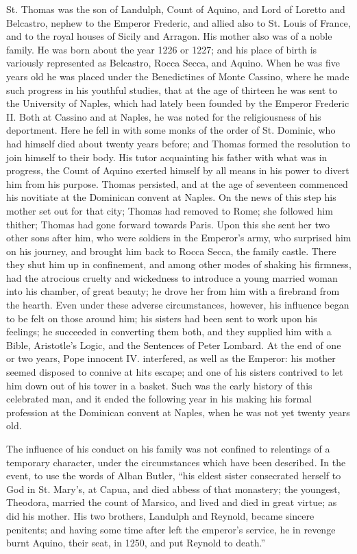 St. Thomas was the son of Landulph, Count of Aquino,
and Lord of Loretto and Belcastro, nephew to the Emperor Frederic, and
allied also to St. Louis of France, and to the royal houses of Sicily
and Arragon. His mother also was of a noble family. He was born about
the year 1226 or 1227; and his place of birth is variously represented
as Belcastro, Rocca Secca, and Aquino. When he was five years old he was
placed under the Benedictines of Monte Cassino, where he made such
progress in his youthful studies, that at the age of thirteen he was
sent to the University of Naples, which had lately been founded by the
Emperor Frederic II. Both at Cassino and at Naples, he was noted for the
religiousness of his deportment. Here he fell in with some monks of the
order of St. Dominic, who had himself died about twenty years before;
and Thomas formed the resolution to join himself to their body. His
tutor acquainting his father with what was in progress, the Count of
Aquino exerted himself by all means in his power to divert him from his
purpose. Thomas persisted, and at the age of seventeen commenced his
novitiate at the Dominican convent at Naples. On the news of this step
his mother set out for that city; Thomas had removed to Rome; she
followed him thither; Thomas had gone forward towards Paris. Upon this
she sent her two other sons after him, who were soldiers in the Emperor's
army, who surprised him on his journey, and brought him back to Rocca
Secca, the family castle. There they shut him up in confinement, and
among other modes of shaking his firmness, had the atrocious cruelty and
wickedness to introduce a young married woman into his chamber, of great
beauty; he drove her from him with a firebrand from the hearth. Even
under these adverse circumstances, however, his influence began to be
felt on those around him; his sisters had been sent to work upon
his feelings; he succeeded in converting them both, and they supplied
him with a Bible, Aristotle's Logic, and the Sentences of Peter Lombard.
At the end of one or two years, Pope innocent IV. interfered, as well as
the Emperor: his mother seemed disposed to connive at hits escape; and
one of his sisters contrived to let him down out of his tower in a
basket. Such was the early history of this celebrated man, and it ended
the following year in his making his formal profession at the Dominican
convent at Naples, when he was not yet twenty years old.

The influence of his conduct on his family was not
confined to relentings of a temporary character, under the circumstances
which have been described. In the event, to use the words of Alban
Butler, ``his eldest sister consecrated herself to God in St. Mary's, at
Capua, and died abbess of that monastery; the youngest, Theodora,
married the count of Marsico, and lived and died in great virtue; as did
his mother. His two brothers, Landulph and Reynold, became sincere
penitents; and having some time after left the emperor's service, he in
revenge burnt Aquino, their seat, in 1250, and put Reynold to death.''

